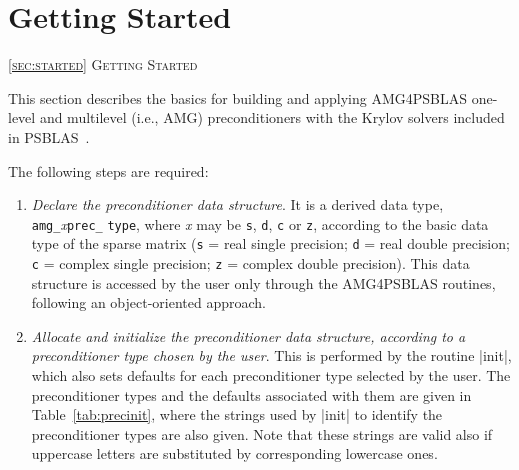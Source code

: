 \section{Getting Started\label{sec:started}}
         {\textsc{\ref{sec:started} Getting Started}}

This section  describes the basics for building and applying
AMG4PSBLAS one-level and multilevel (i.e., AMG) preconditioners with
the Krylov solvers included in PSBLAS~\cite{PSBLASGUIDE}.

The following steps are required:
\begin{enumerate}
\item \emph{Declare the preconditioner data structure}. It is a derived data type,
  \verb|amg_|\-\emph{x}\verb|prec_| \verb|type|, where \emph{x} may be
  \verb|s|, \verb|d|, \verb|c| or \verb|z|, according to the basic
  data type of the sparse matrix (\verb|s| = real single precision;
  \verb|d| = real double precision; 	\verb|c| = complex single
  precision; \verb|z| = complex double precision). 	This data
  structure is accessed by the user only through the AMG4PSBLAS
  routines, 	following an object-oriented approach.
\item \emph{Allocate and initialize the preconditioner data structure,
    according to a preconditioner type chosen by the user}. This is
  performed by the routine  	\fortinline|init|, which also sets
  defaults for each preconditioner 	type selected by the user. The
  preconditioner types and the defaults associated 	with them are
  given in Table~\ref{tab:precinit}, where the strings used by
  \fortinline|init| to identify the preconditioner types are also
  given. 	Note that these strings are valid also if uppercase
  letters are substituted by 	corresponding lowercase ones. 


\end{enumerate}
